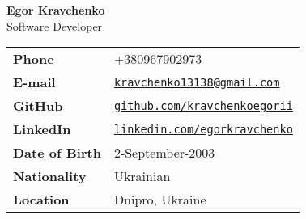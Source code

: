 \textbf{\LARGE Egor Kravchenko} \\
Software Developer
\hspace*{0.55\textwidth}
\begin{tabular*}{\textwidth}{ll}
    \textbf{Phone}         & +380967902973                                                                      \\
    \textbf{E-mail}        & \href{mailto:kravchenko13138@gmail.com}{\verb"kravchenko13138@gmail.com"}                   \\
    \textbf{GitHub}        & \href{https://github.com/kravchenkoegorii}{\verb"github.com/kravchenkoegorii"}            \\
    \textbf{LinkedIn}      & \href{https://www.linkedin.com/in/egorkravchenko}{\verb"linkedin.com/egorkravchenko"} \\
    \textbf{Date of Birth} & 2-September-2003                                                                      \\
    \textbf{Nationality}   & Ukrainian                                                                         \\
    \textbf{Location}       & Dnipro, Ukraine
\end{tabular*}